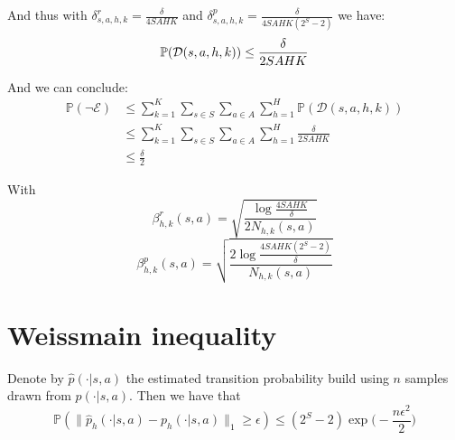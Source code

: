 \documentclass[a4paper]{article}
\newcommand{\wh}[1]{\widehat{#1}}
\begin{document}
And thus with $\delta^r_{s, a, h, k} = \frac{\delta}{4SAHK}$ and $\delta^p_{s, a, h, k} = \frac{\delta}{4SAHK(2^S - 2)}$ we have:
\begin{equation*}
    \mathbb{P}(\mathcal{D}(s, a, h, k)) \le \frac{\delta}{2SAHK} \\
\end{equation*}

And we can conclude:
\begin{equation*}
    \begin{aligned}
        \mathbb{P}(\neg \mathcal{E}) & \le \sum_{k=1}^K\sum_{s \in S}\sum_{a\in A}\sum_{h=1}^H \mathbb{P}(\mathcal{D}(s, a, h, k)) \\
                                     & \le \sum_{k=1}^K\sum_{s \in S}\sum_{a\in A}\sum_{h=1}^H \frac{\delta}{2SAHK}                \\
                                     & \le \frac{\delta}{2}
    \end{aligned}
\end{equation*}

With
\begin{equation*}
    \boxed{\beta^r_{h, k}(s, a) = \sqrt{\frac{\log{\frac{4SAHK}{\delta}}}{2N_{h, k}(s, a)}}}
\end{equation*}
\begin{equation*}
    \boxed{\beta^p_{h, k}(s, a) = \sqrt{\frac{2\log{\frac{4SAHK(2^S-2)}{\delta}}}{N_{h, k}(s, a)}}}
\end{equation*}



\appendix
\section{Weissmain inequality}
Denote by $\wh{p}(\cdot|s,a)$ the estimated transition probability build using $n$ samples drawn from $p(\cdot|s,a)$. Then we have that
\[
    \mathbb{P}(\|\wh{p}_h(\cdot|s,a) - p_h(\cdot|s,a)\|_1 \geq \epsilon) \leq  (2^S - 2) \exp\Big(- \frac{n \epsilon^2}{2} \Big)
\]



\end{document}
